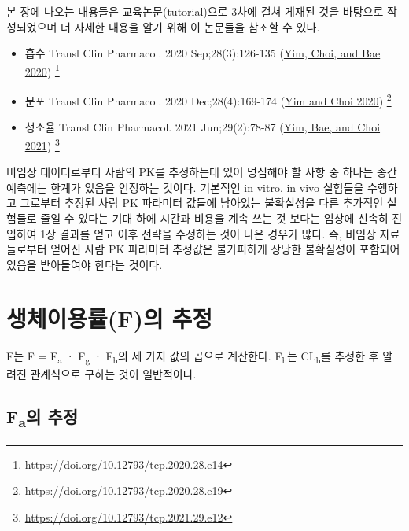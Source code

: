 \documentclass[
  11pt,
  krantz2, a4paper, twoside]{krantz}
\providecommand{\tightlist}{%
  \setlength{\itemsep}{0pt}\setlength{\parskip}{0pt}}
\begin{document}
본 장에 나오는 내용들은 교육논문(tutorial)으로 3차에 걸쳐 게재된 것을 바탕으로 작성되었으며 더 자세한 내용을 알기 위해 이 논문들을 참조할 수 있다.

\begin{itemize}
\tightlist
\item
  흡수 Transl Clin Pharmacol. 2020 Sep;28(3):126-135 (\protect\hyperlink{ref-yimabsorption}{Yim, Choi, and Bae 2020}) \footnote{\url{https://doi.org/10.12793/tcp.2020.28.e14}}
\item
  분포 Transl Clin Pharmacol. 2020 Dec;28(4):169-174 (\protect\hyperlink{ref-yim2020predicting}{Yim and Choi 2020}) \footnote{\url{https://doi.org/10.12793/tcp.2020.28.e19}}
\item
  청소율 Transl Clin Pharmacol. 2021 Jun;29(2):78-87 (\protect\hyperlink{ref-yim2021predicting}{Yim, Bae, and Choi 2021}) \footnote{\url{https://doi.org/10.12793/tcp.2021.29.e12}}
\end{itemize}

비임상 데이터로부터 사람의 PK를 추정하는데 있어 명심해야 할 사항 중 하나는 종간 예측에는 한계가 있음을 인정하는 것이다.
기본적인 in vitro, in vivo 실험들을 수행하고 그로부터 추정된 사람 PK 파라미터 값들에 남아있는 불확실성을 다른 추가적인 실험들로 줄일 수 있다는 기대 하에 시간과 비용을 계속 쓰는 것 보다는 임상에 신속히 진입하여 1상 결과를 얻고 이후 전략을 수정하는 것이 나은 경우가 많다.
즉, 비임상 자료들로부터 얻어진 사람 PK 파라미터 추정값은 불가피하게 상당한 불확실성이 포함되어 있음을 받아들여야 한다는 것이다.

\hypertarget{uxc0dduxccb4uxc774uxc6a9uxb960fuxc758-uxcd94uxc815}{%
\section{생체이용률(F)의 추정}\label{uxc0dduxccb4uxc774uxc6a9uxb960fuxc758-uxcd94uxc815}}

F는 F = F\textsubscript{a} · F\textsubscript{g} · F\textsubscript{h}의 세 가지 값의 곱으로 계산한다.
F\textsubscript{h}는 CL\textsubscript{h}를 추정한 후 알려진 관계식으로 구하는 것이 일반적이다.

\hypertarget{fauxc758-uxcd94uxc815}{%
\subsection{\texorpdfstring{F\textsubscript{a}의 추정}{Fa의 추정}}\label{fauxc758-uxcd94uxc815}}
\end{document}
